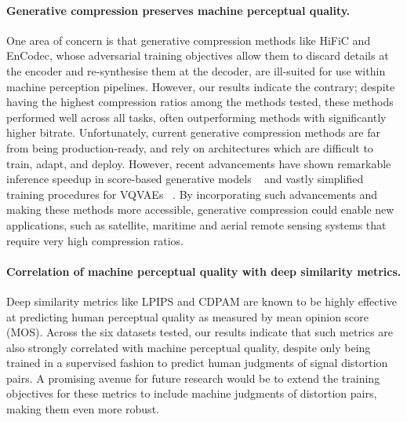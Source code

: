 \documentclass[10pt,twocolumn,letterpaper]{article}
\begin{document}
\paragraph{Generative compression preserves machine perceptual quality.} One area of concern is that generative compression methods like HiFiC and EnCodec, whose adversarial training objectives allow them to discard details at the encoder and re-synthesise them at the decoder, are ill-suited for use within machine perception pipelines. However, our results indicate the contrary; despite having the highest compression ratios among the methods tested, these methods performed well across all tasks, often outperforming methods with significantly higher bitrate. Unfortunately, current generative compression methods are far from being production-ready, and rely on architectures which are difficult to train, adapt, and deploy. However, recent advancements have shown remarkable inference speedup in score-based generative models ~\cite{song2023consistency} and vastly simplified training procedures for VQVAEs ~\cite{mentzer2023finite}. By incorporating such advancements and making these methods more accessible, generative compression could enable new applications, such as satellite, maritime and aerial remote sensing systems that require very high compression ratios.

\paragraph{Correlation of machine perceptual quality with deep similarity metrics.} Deep similarity metrics like LPIPS and CDPAM are known to be highly effective at predicting human perceptual quality as measured by mean opinion score (MOS). Across the six datasets tested, our results indicate that such metrics are also strongly correlated with machine perceptual quality, despite only being trained in a supervised fashion to predict human judgments of signal distortion pairs. A promising avenue for future research would be to extend the training objectives for these metrics to include machine judgments of distortion pairs, making them even more robust.
\end{document}
